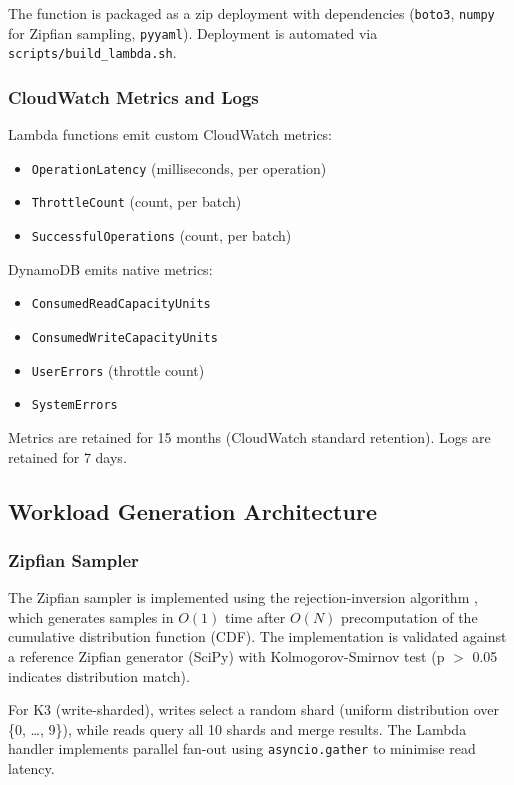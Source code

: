 The function is packaged as a zip deployment with dependencies (\texttt{boto3}, \texttt{numpy} for Zipfian sampling, \texttt{pyyaml}). Deployment is automated via \texttt{scripts/build\_lambda.sh}.

\subsubsection{CloudWatch Metrics and Logs}

Lambda functions emit custom CloudWatch metrics:

\begin{itemize}
    \item \texttt{OperationLatency} (milliseconds, per operation)
    \item \texttt{ThrottleCount} (count, per batch)
    \item \texttt{SuccessfulOperations} (count, per batch)
\end{itemize}

DynamoDB emits native metrics:

\begin{itemize}
    \item \texttt{ConsumedReadCapacityUnits}
    \item \texttt{ConsumedWriteCapacityUnits}
    \item \texttt{UserErrors} (throttle count)
    \item \texttt{SystemErrors}
\end{itemize}

Metrics are retained for 15 months (CloudWatch standard retention). Logs are retained for 7 days.

\subsection{Workload Generation Architecture}

\subsubsection{Zipfian Sampler}

The Zipfian sampler is implemented using the rejection-inversion algorithm \citep{devroye1986non}, which generates samples in $O(1)$ time after $O(N)$ precomputation of the cumulative distribution function (CDF). The implementation is validated against a reference Zipfian generator (SciPy) with Kolmogorov-Smirnov test (p $>$ 0.05 indicates distribution match).

For K3 (write-sharded), writes select a random shard (uniform distribution over \{0, \ldots, 9\}), while reads query all 10 shards and merge results. The Lambda handler implements parallel fan-out using \texttt{asyncio.gather} to minimise read latency.

